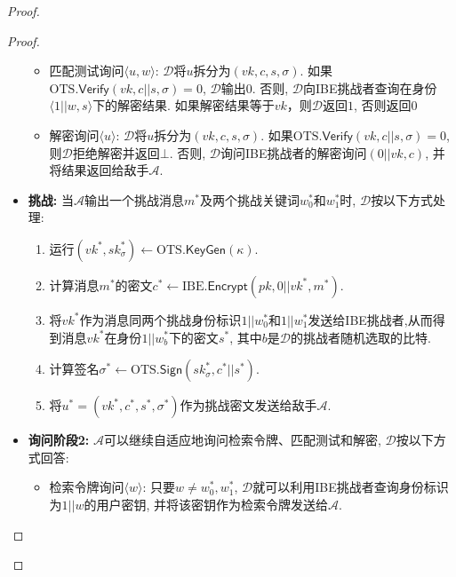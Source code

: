 \begin{proof}
\begin{proof}
\begin{trivlist}
\begin{itemize}
\begin{itemize}
			\item 匹配测试询问$\langle u, w \rangle$:  $\mathcal{D}$将$u$拆分为$(vk, c, s, \sigma)$. 如果$\text{OTS}.\mathsf{Verify}(vk, c||s, \sigma) = 0$, $\mathcal{D}$输出$0$. 否则, $\mathcal{D}$向IBE挑战者查询在身份$\langle 1||w, s \rangle$下的解密结果. 如果解密结果等于$vk$，则$\mathcal{D}$返回$1$, 否则返回$0$
			\item 解密询问$\langle u \rangle$: $\mathcal{D}$将$u$拆分为$(vk, c, s, \sigma)$.
				如果$\text{OTS}.\mathsf{Verify}(vk, c||s, \sigma) = 0$,
				则$\mathcal{D}$拒绝解密并返回$\bot$. 否则, $\mathcal{D}$询问IBE挑战者的解密询问$(0||vk, c)$, 并将结果返回给敌手$\mathcal{A}$.
		\end{itemize}

	\item \textbf{挑战:} 当$\mathcal{A}$输出一个挑战消息$m^*$及两个挑战关键词$w_0^*$和$w_1^*$时, $\mathcal{D}$按以下方式处理:\vspace{-0.5em}
		\begin{enumerate} \itemsep 1pt \parskip 0pt \parsep 0pt
			\item 运行$(vk^*, sk_\sigma^*) \leftarrow \text{OTS}.\mathsf{KeyGen}(\kappa)$.
			\item 计算消息$m^*$的密文$c^* \leftarrow \text{IBE}.\mathsf{Encrypt}(pk, 0||vk^*, m^*)$.
			\item 将$vk^*$作为消息同两个挑战身份标识$1||w_0^*$和$1||w_1^*$发送给IBE挑战者,从而得到消息$vk^*$在身份$1||w_b^*$下的密文$s^*$, 其中$b$是$\mathcal{D}$的挑战者随机选取的比特.
			\item 计算签名$\sigma^* \leftarrow \text{OTS}.\mathsf{Sign}(sk_\sigma^*, c^*||s^*)$.
			\item 将$u^* = (vk^*, c^*, s^*, \sigma^*)$作为挑战密文发送给敌手$\mathcal{A}$.
		\end{enumerate}

	\item \textbf{询问阶段2:} $\mathcal{A}$可以继续自适应地询问检索令牌、匹配测试和解密, $\mathcal{D}$按以下方式回答:\vspace{-0.5em}
		\begin{itemize} \itemsep 1pt \parskip 0pt \parsep 0pt
			\item 检索令牌询问$\langle w \rangle$: 只要$w \neq w_0^*, w_1^*$, $\mathcal{D}$就可以利用IBE挑战者查询身份标识为$1||w$的用户密钥, 并将该密钥作为检索令牌发送给$\mathcal{A}$.


\end{itemize}
\end{itemize}
\end{trivlist}
\end{proof}
\end{proof}
